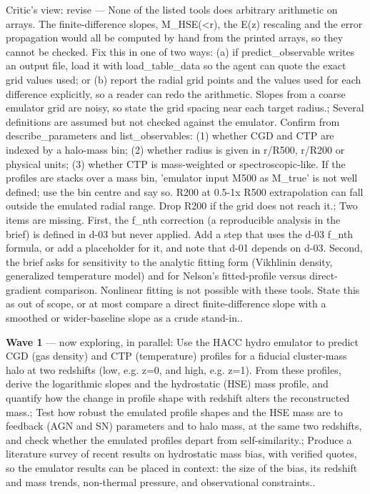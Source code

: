 \documentclass[11pt,a4paper]{article}
\begin{document}
\begin{enumerate}
Critic's view: revise --- None of the listed tools does arbitrary arithmetic on arrays. The finite-difference slopes, M\_HSE(\textless{}r), the E(z) rescaling and the error propagation would all be computed by hand from the printed arrays, so they cannot be checked. Fix this in one of two ways: (a) if predict\_observable writes an output file, load it with load\_table\_data so the agent can quote the exact grid values used; or (b) report the radial grid points and the values used for each difference explicitly, so a reader can redo the arithmetic. Slopes from a coarse emulator grid are noisy, so state the grid spacing near each target radius.; Several definitions are assumed but not checked against the emulator. Confirm from describe\_parameters and list\_observables: (1) whether CGD and CTP are indexed by a halo-mass bin; (2) whether radius is given in r/R500, r/R200 or physical units; (3) whether CTP is mass-weighted or spectroscopic-like. If the profiles are stacks over a mass bin, 'emulator input M500 as M\_true' is not well defined; use the bin centre and say so. R200 at 0.5-1x R500 extrapolation can fall outside the emulated radial range. Drop R200 if the grid does not reach it.; Two items are missing. First, the f\_nth correction (a reproducible analysis in the brief) is defined in d-03 but never applied. Add a step that uses the d-03 f\_nth formula, or add a placeholder for it, and note that d-01 depends on d-03. Second, the brief asks for sensitivity to the analytic fitting form (Vikhlinin density, generalized temperature model) and for Nelson's fitted-profile versus direct-gradient comparison. Nonlinear fitting is not possible with these tools. State this as out of scope, or at most compare a direct finite-difference slope with a smoothed or wider-baseline slope as a crude stand-in..

\end{enumerate}
\textbf{Wave 1} --- now exploring, in parallel: Use the HACC hydro emulator to predict CGD (gas density) and CTP (temperature) profiles for a fiducial cluster-mass halo at two redshifts (low, e.g. z=0, and high, e.g. z=1). From these profiles, derive the logarithmic slopes and the hydrostatic (HSE) mass profile, and quantify how the change in profile shape with redshift alters the reconstructed mass.; Test how robust the emulated profile shapes and the HSE mass are to feedback (AGN and SN) parameters and to halo mass, at the same two redshifts, and check whether the emulated profiles depart from self-similarity.; Produce a literature survey of recent results on hydrostatic mass bias, with verified quotes, so the emulator results can be placed in context: the size of the bias, its redshift and mass trends, non-thermal pressure, and observational constraints..
\end{document}
